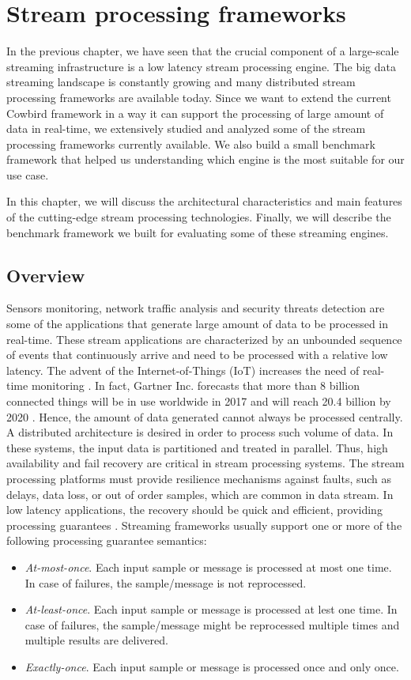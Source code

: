 \chapter{Stream processing frameworks}
In the previous chapter, we have seen that the crucial component of a large-scale streaming infrastructure is a low latency stream processing engine. The big data streaming landscape is constantly growing and many distributed stream processing frameworks are available today. Since we want to extend 
the current Cowbird framework in a way it can support the processing of large amount of data in real-time, we extensively studied and analyzed some of the stream processing frameworks currently available. We also build a small benchmark framework that helped us understanding which engine is the most suitable for our use case.

In this chapter, we will discuss the architectural characteristics and main features of the cutting-edge stream processing technologies. Finally, we will describe the benchmark framework we built for evaluating some of these streaming engines.
\section{Overview}
Sensors monitoring, network traffic analysis and security threats detection are some of the applications that generate large amount of data to be processed in real-time. These stream applications are characterized by an unbounded sequence of events that continuously arrive and need to be processed with a relative low latency. The advent of the Internet-of-Things (IoT) increases the need of real-time monitoring \cite{streamprocessingcomparison}. In fact, Gartner Inc. forecasts that more than 8 billion connected things will be in use worldwide in 2017 and will reach 20.4 billion by 2020 \cite{gartnerarticleonline}. Hence, the amount of data generated cannot always be processed centrally. A distributed architecture is desired in order to process such volume of data.  In these systems, the input data is partitioned and treated in parallel. Thus, high availability and fail recovery are critical in stream processing systems. The stream processing platforms must provide resilience mechanisms against faults, such as delays, data loss, or out of order samples, which are common in data stream. In low latency applications, the recovery should be quick and efficient, providing processing guarantees \cite{streamprocessingcomparison}. Streaming frameworks usually support one or more of the following processing guarantee semantics:
\begin{itemize}
\item \emph{At-most-once}. Each input sample or message is processed at most one time. In case of failures, the sample/message is not reprocessed.
\item \emph{At-least-once}.  Each input sample or message is processed at lest one time. In case of failures, the sample/message might be reprocessed multiple times and multiple results are delivered.
\item  \emph{Exactly-once}. Each input sample or message is processed once and only once.
\end{itemize}

